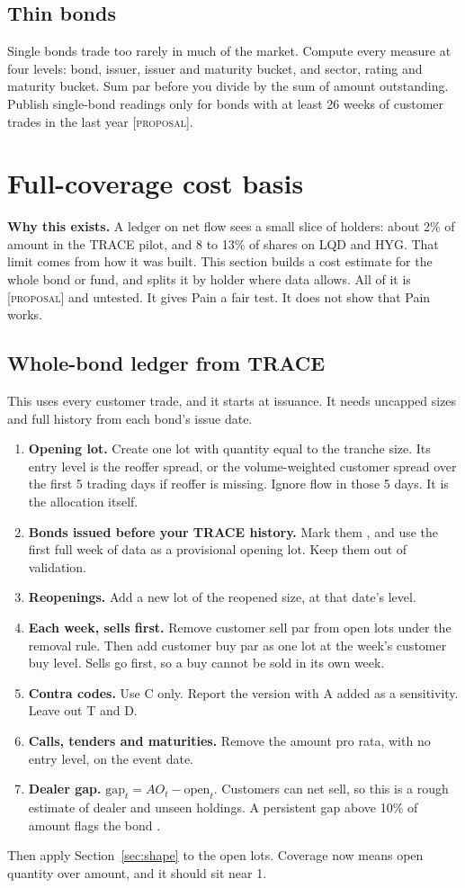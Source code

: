 \documentclass[11pt]{article}
\newcommand{\code}[1]{\texttt{\detokenize{#1}}}
\newcommand{\proposal}{\textsc{[proposal]}}
\begin{document}
\subsection{Thin bonds}
Single bonds trade too rarely in much of the market. Compute every measure at four levels: bond, issuer, issuer and maturity bucket, and sector, rating and maturity bucket. Sum par before you divide by the sum of amount outstanding. Publish single-bond readings only for bonds with at least 26 weeks of customer trades in the last year \proposal.

\section{Full-coverage cost basis}\label{sec:cost}
\textbf{Why this exists.} A ledger on net flow sees a small slice of holders: about 2\% of amount in the TRACE pilot, and 8 to 13\% of shares on LQD and HYG. That limit comes from how it was built. This section builds a cost estimate for the whole bond or fund, and splits it by holder where data allows. All of it is \proposal{} and untested. It gives Pain a fair test. It does not show that Pain works.

\subsection{Whole-bond ledger from TRACE}\label{sec:wholebond}
This uses every customer trade, and it starts at issuance. It needs uncapped sizes and full history from each bond's issue date.
\begin{enumerate}
\item \textbf{Opening lot.} Create one lot with quantity equal to the tranche size. Its entry level is the reoffer spread, or the volume-weighted customer spread over the first 5 trading days if reoffer is missing. Ignore flow in those 5 days. It is the allocation itself.
\item \textbf{Bonds issued before your TRACE history.} Mark them \code{start_known = 0}, and use the first full week of data as a provisional opening lot. Keep them out of validation.
\item \textbf{Reopenings.} Add a new lot of the reopened size, at that date's level.
\item \textbf{Each week, sells first.} Remove customer sell par from open lots under the removal rule. Then add customer buy par as one lot at the week's customer buy level. Sells go first, so a buy cannot be sold in its own week.
\item \textbf{Contra codes.} Use C only. Report the version with A added as a sensitivity. Leave out T and D.
\item \textbf{Calls, tenders and maturities.} Remove the amount pro rata, with no entry level, on the event date.
\item \textbf{Dealer gap.} $\mathrm{gap}_t = AO_t - \mathrm{open}_t$. Customers can net sell, so this is a rough estimate of dealer and unseen holdings. A persistent gap above 10\% of amount flags the bond \code{gap_flag = 1}.
\end{enumerate}
Then apply Section~\ref{sec:shape} to the open lots. Coverage now means open quantity over amount, and it should sit near 1.
\end{document}
